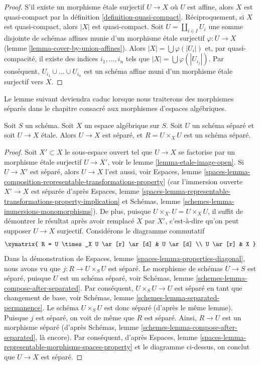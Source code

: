 \begin{proof}
S'il existe un morphisme étale surjectif $U \to X$ où $U$
est affine, alors $X$ est quasi-compact par la définition \ref{definition-quasi-compact}.
Réciproquement, si $X$ est quasi-compact, alors $|X|$ est quasi-compact.
Soit $U = \coprod_{i \in I} U_i$ une somme disjointe de schémas affines
munie d'un morphisme étale surjectif $\varphi : U \to X$
(lemme \ref{lemma-cover-by-union-affines}).
Alors $|X| = \bigcup \varphi(|U_i|)$ et,
par quasi-compacité, il existe des indices $i_1, \ldots, i_n$
tels que $|X| = \bigcup \varphi(|U_{i_j}|)$. Par conséquent,
$U_{i_1} \cup \ldots \cup U_{i_n}$ est un schéma affine muni d'un
morphisme étale surjectif vers $X$.
\end{proof}

\noindent
Le lemme suivant deviendra caduc lorsque nous traiterons des
morphismes séparés dans le chapitre consacré aux morphismes d'espaces algébriques.

\begin{lemma}
\label{lemma-separated-cover}
Soit $S$ un schéma.
Soit $X$ un espace algébrique sur $S$.
Soit $U$ un schéma séparé et soit $U \to X$ étale.
Alors $U \to X$ est séparé, et $R = U \times_X U$ est un schéma séparé.
\end{lemma}

\begin{proof}
Soit $X' \subset X$ le sous-espace ouvert tel que $U \to X$ se factorise
par un morphisme étale surjectif $U \to X'$, voir le
lemme \ref{lemma-etale-image-open}.
Si $U \to X'$ est séparé, alors $U \to X$ l'est aussi, voir
Espaces, lemme
\ref{spaces-lemma-composition-representable-transformations-property}
(car l'immersion ouverte $X' \to X$ est séparée d'après
Espaces, lemme
\ref{spaces-lemma-representable-transformations-property-implication}
et
Schémas, lemme \ref{schemes-lemma-immersions-monomorphisms}).
De plus, puisque $U \times_{X'} U = U \times_X U$, il suffit
de démontrer le résultat après avoir remplacé $X$ par $X'$, c'est-à-dire qu'on peut
supposer $U \to X$ surjectif.
Considérons le diagramme commutatif
$$
\xymatrix{
R = U \times_X U \ar[r] \ar[d] & U \ar[d] \\
U \ar[r] & X
}
$$
Dans la démonstration de
Espaces, lemme \ref{spaces-lemma-properties-diagonal},
nous avons vu que $j : R \to U \times_S U$ est séparé.
Le morphisme de schémas $U \to S$ est séparé, puisque $U$ est un schéma
séparé, voir
Schémas, lemme \ref{schemes-lemma-compose-after-separated}.
Par conséquent, $U \times_S U \to U$ est séparé en tant que changement de base, voir
Schémas, lemme \ref{schemes-lemma-separated-permanence}.
Le schéma $U \times_S U$ est donc séparé (d'après le même lemme).
Puisque $j$ est séparé, on voit de même que $R$ est séparé.
Ainsi, $R \to U$ est un morphisme séparé (d'après
Schémas, lemme \ref{schemes-lemma-compose-after-separated},
là encore). Par conséquent, d'après
Espaces, lemme \ref{spaces-lemma-representable-morphisms-spaces-property}
et le diagramme ci-dessus, on conclut que $U \to X$ est séparé.
\end{proof}

